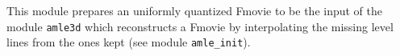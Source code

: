 This module prepares an uniformly quantized Fmovie to be the input of the 
module \verb+amle3d+ which reconstructs
a Fmovie by interpolating the missing level lines from the ones kept
(see module \verb+amle_init+).